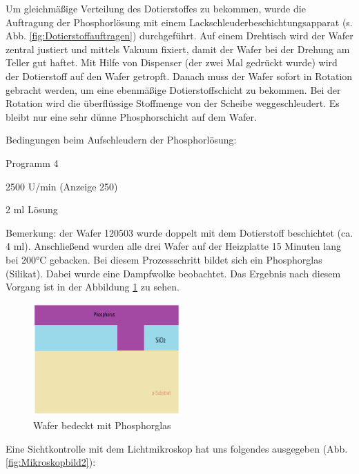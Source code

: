 Um gleichmäßige Verteilung des Dotierstoffes zu bekommen, wurde die Auftragung der Phosphorlösung mit einem Lackschleuderbeschichtungsapparat (s. Abb. \ref{fig:Dotierstoffauftragen}) durchgeführt.
Auf einem Drehtisch wird der Wafer zentral justiert und mittels Vakuum fixiert, damit der Wafer bei der Drehung am Teller gut haftet. Mit Hilfe von Dispenser (der zwei
Mal gedrückt wurde) wird der Dotierstoff auf den Wafer getropft. Danach muss der Wafer sofort in Rotation gebracht werden, um eine ebenmäßige Dotierstoffschicht zu bekommen. Bei der Rotation wird die überflüssige Stoffmenge von der Scheibe weggeschleudert.
Es bleibt nur eine sehr dünne Phosphorschicht auf dem Wafer.

Bedingungen beim Aufschleudern der Phosphorlösung:

\vspace{3mm}


\begin{center}

Programm 4

2500 U/min (Anzeige 250)

2 ml Lösung

\end{center}

\vspace{5mm}
Bemerkung: der Wafer 120503 wurde doppelt mit dem Dotierstoff beschichtet (ca. 4 ml).
Anschließend wurden alle drei Wafer auf der Heizplatte 15 Minuten lang bei 200°C gebacken. Bei diesem Prozessschritt bildet sich ein  Phosphorglas (Silikat). Dabei wurde eine Dampfwolke beobachtet.
Das Ergebnis nach diesem Vorgang ist in der Abbildung \ref{fig:StrukturmitPhosphorus} zu sehen.

\begin{figure}[H]
    \centering
        \includegraphics[width=0.5\textwidth]{bilder/StrukturmitPhosphorus.png}
    \caption{Wafer bedeckt mit Phosphorglas}
    \label{fig:StrukturmitPhosphorus}
\end{figure}

Eine Sichtkontrolle mit dem Lichtmikroskop hat uns folgendes ausgegeben (Abb. \ref{fig:Mikroskopbild2}):

